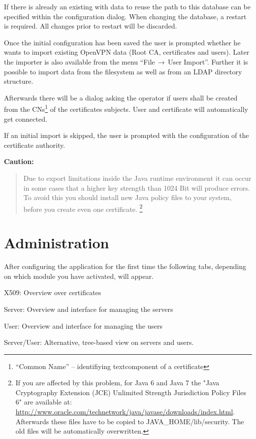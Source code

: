 \newpage


\nl If there is already an existing \Nbms with data to reuse the path to this
database can be specified within the configuration dialog. When changing the
database, a restart is required. All changes prior to restart will be discarded.

\nl Once the initial configuration has been saved the user is prompted
whether he wants
to import existing OpenVPN data (Root CA, certificates and users). Later the
importer is
also available from the menu ``File$\,\rightarrow\,$User Import''. Further
it is possible to import data from the filesystem as well as from an
LDAP directory structure.
%

Afterwards there will be a dialog asking the operator if users shall be
created from the CNs\footnote{%
\sffamily ``Common Name'' -- identifiying textcomponent of a certificate} of
the
certificates subjects. User and certificate will automatically get
connected.
%

\nl If an initial import is skipped, the user is prompted with the
configuration of
the certificate authority.

\nl\textbf{Caution: }\begin{quote} Due to export limitations inside the Java
runtime environment it can occur in some cases that a higher key strength
than 1024 Bit will produce errors.  To avoid this you should install new
Java policy files to your system, before you create even one certificate.
\footnote{If you are affected by this problem, for Java 6 and Java 7 the 
"Java Cryptography Extension (JCE) Unlimited Strength Jurisdiction Policy 
Files 6" are available at:
\url{http://www.oracle.com/technetwork/java/javase/downloads/index.html}.
Afterwards these files have to be copied to JAVA\_HOME/lib/security.  The
old files will be automatically overwritten.} \end{quote}

%
\newpage
%

\section{Administration}

%
After configuring the application for the first time the following
tabs, depending on which module you have activated, will appear.

\begin{items}
   \item X509: Overview over certificates
   \item Server: Overview and interface for managing the servers
   \item User: Overview and interface for managing the users
   \item Server/User: Alternative, tree-based view on servers and users.
\end{items}

